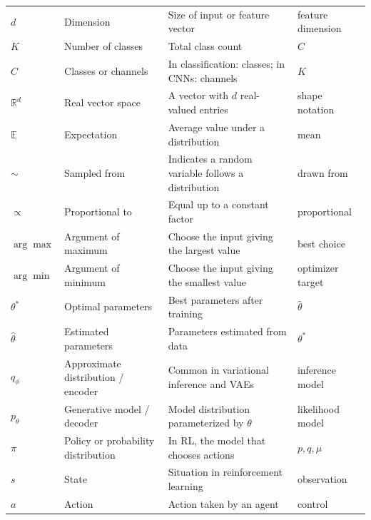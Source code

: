 \documentclass{article}
\begin{document}
\begin{longtable}{>{\centering\arraybackslash}p{2.2cm} p{3.5cm} p{5cm} p{3.5cm}}
$d$ & Dimension & Size of input or feature vector & feature dimension \\

$K$ & Number of classes & Total class count & $C$ \\

$C$ & Classes or channels & In classification: classes; in CNNs: channels & $K$ \\

$\mathbb{R}^d$ & Real vector space & A vector with $d$ real-valued entries & shape notation \\

$\mathbb{E}$ & Expectation & Average value under a distribution & mean \\

$\sim$ & Sampled from & Indicates a random variable follows a distribution & drawn from \\

$\propto$ & Proportional to & Equal up to a constant factor & proportional \\

$\arg\max$ & Argument of maximum & Choose the input giving the largest value & best choice \\

$\arg\min$ & Argument of minimum & Choose the input giving the smallest value & optimizer target \\

$\theta^*$ & Optimal parameters & Best parameters after training & $\hat{\theta}$ \\

$\hat{\theta}$ & Estimated parameters & Parameters estimated from data & $\theta^*$ \\

$q_\phi$ & Approximate distribution / encoder & Common in variational inference and VAEs & inference model \\

$p_\theta$ & Generative model / decoder & Model distribution parameterized by $\theta$ & likelihood model \\

$\pi$ & Policy or probability distribution & In RL, the model that chooses actions & $p, q, \mu$ \\

$s$ & State & Situation in reinforcement learning & observation \\

$a$ & Action & Action taken by an agent & control \\


\end{longtable}
\end{document}
